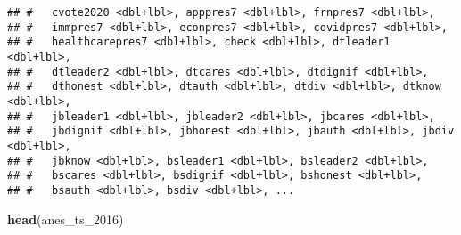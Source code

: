 \documentclass[
]{article}
\newenvironment{Shaded}{\begin{snugshade}}{\end{snugshade}}
\newcommand{\DecValTok}[1]{\textcolor[rgb]{0.00,0.00,0.81}{#1}}
\newcommand{\KeywordTok}[1]{\textcolor[rgb]{0.13,0.29,0.53}{\textbf{#1}}}
\newcommand{\NormalTok}[1]{#1}
\begin{document}
\begin{verbatim}
## #   cvote2020 <dbl+lbl>, apppres7 <dbl+lbl>, frnpres7 <dbl+lbl>,
## #   immpres7 <dbl+lbl>, econpres7 <dbl+lbl>, covidpres7 <dbl+lbl>,
## #   healthcarepres7 <dbl+lbl>, check <dbl+lbl>, dtleader1 <dbl+lbl>,
## #   dtleader2 <dbl+lbl>, dtcares <dbl+lbl>, dtdignif <dbl+lbl>,
## #   dthonest <dbl+lbl>, dtauth <dbl+lbl>, dtdiv <dbl+lbl>, dtknow <dbl+lbl>,
## #   jbleader1 <dbl+lbl>, jbleader2 <dbl+lbl>, jbcares <dbl+lbl>,
## #   jbdignif <dbl+lbl>, jbhonest <dbl+lbl>, jbauth <dbl+lbl>, jbdiv <dbl+lbl>,
## #   jbknow <dbl+lbl>, bsleader1 <dbl+lbl>, bsleader2 <dbl+lbl>,
## #   bscares <dbl+lbl>, bsdignif <dbl+lbl>, bshonest <dbl+lbl>,
## #   bsauth <dbl+lbl>, bsdiv <dbl+lbl>, ...
\end{verbatim}

\begin{Shaded}
\begin{Highlighting}[]
\KeywordTok{head}\NormalTok{(anes_ts_}\DecValTok{2016}\NormalTok{)}
\end{Highlighting}
\end{Shaded}
\end{document}
